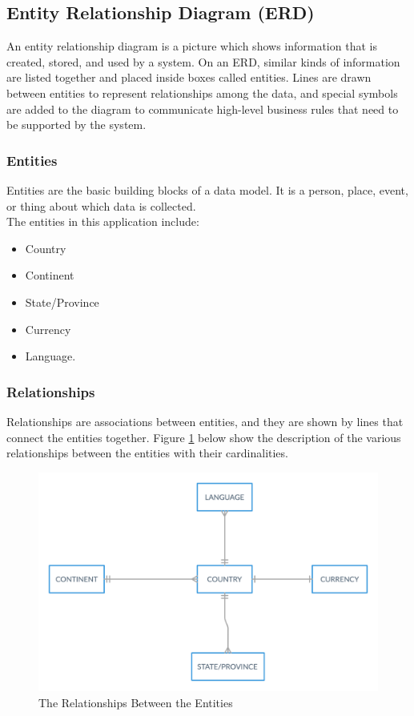 \documentclass[twoside, a4paper, 12pt]{report}
\begin{document}
\subsection{Entity Relationship Diagram (ERD)}
An entity relationship diagram is a picture which shows information that is created, stored, and used by a system. On an ERD, similar kinds of information are listed together and placed inside boxes called entities. Lines are drawn between entities to represent relationships among the data, and special symbols are added to the diagram to communicate high-level business rules that need to be supported by the system.

\subsubsection{Entities}
Entities are the basic building blocks of a data model. It is a person, place, event, or thing about which data is collected.\\
The entities in this application include:
\begin{itemize}
	\item Country
	\item Continent
	\item State/Province
	\item Currency
	\item Language.
\end{itemize}

\subsubsection{Relationships}
Relationships are associations between entities, and they are shown by lines that connect the entities together.
Figure \ref{fig:relationships} below show the description of the various relationships between the entities with their cardinalities.

\begin{figure} [ht]
	\centering
	\includegraphics[width=1.0\textwidth]{relationships.png}
	\caption{The Relationships Between the Entities}
	\label{fig:relationships}
\end{figure}
\end{document}
